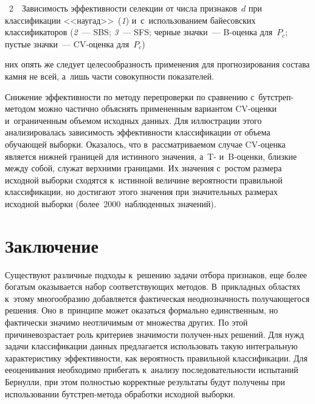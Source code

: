 \begin{multicols}{2}

\noindent
{{\figurename~2}\ \ \small{Зависимость эффективности селекции от чис\-ла признаков~$d$ при 
классификации <<наугад>>~(\textit{1}) и~с~использованием байесовских классификаторов 
(\textit{2}~--- SBS; \textit{3}~--- SFS; черные значки~---  
B-оцен\-ка для~$P_c$; пустые значки~--- CV-оцен\-ка для~$P_c$)}}



     

     
\noindent
 них опять же следует целесообразность 
применения для прогнозирования состава камня не всей, а~лишь части 
совокупности показателей. 
     
     Снижение эффективности по методу перепроверки по сравнению  
с~бут\-стреп-ме\-то\-дом мож\-но частично объяснять примененным вариантом\linebreak  
CV-оцен\-ки и~ограниченным объемом исходных данных. Для иллюстрации 
этого анализировалась зависимость эффективности классификации от объема 
обучающей выборки. Оказалось, что в~рассматриваемом случае CV-оцен\-ка 
является нижней границей для истинного значения, а~T- и~B-оцен\-ки, близкие 
между собой, служат верхними границами. Их значения с~ростом размера 
исходной выборки сходятся к~истинной величине вероятности правильной 
классификации, но достигают этого значения при значительных размерах 
исходной выборки (более~2000~наблюденных значений).

\vspace*{-6pt}

\section{Заключение}

     Существуют различные подходы к~решению зада\-чи отбора признаков, 
еще более богатым ока\-зы\-ва\-ет\-ся набор соответствующих методов. 
В~прикладных областях к~этому многообразию добавляется фактическая 
неоднозначность получающегося решения. Оно в~принципе может оказаться 
формально единственным, но фактически значимо неотличимым от множества 
других. По этой причине\linebreak возрастает роль критериев значимости получен-\linebreak  ных
решений. Для нужд задачи классификации\linebreak
 данных предлагается использовать 
такую интегральную характеристику эффективности, как вероятность 
правильной классификации. Для ее\linebreak оценивания необходимо прибегать 
к~анализу последовательности испытаний Бернулли, при этом пол\-ностью 
корректные результаты будут получены при использовании  
бут\-стреп-ме\-то\-да обработки исходной выборки. 
     

\end{multicols}
